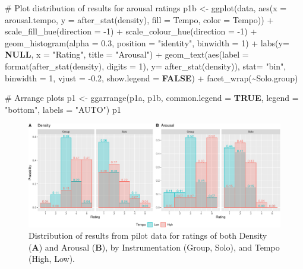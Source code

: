 \documentclass[
  bookmarksnumbered]{article}
\newenvironment{Shaded}{\begin{snugshade}}{\end{snugshade}}
\newcommand{\AttributeTok}[1]{\textcolor[rgb]{0.80,0.80,0.80}{#1}}
\newcommand{\CommentTok}[1]{\textcolor[rgb]{0.50,0.62,0.50}{#1}}
\newcommand{\ConstantTok}[1]{\textcolor[rgb]{0.86,0.64,0.64}{\textbf{#1}}}
\newcommand{\DecValTok}[1]{\textcolor[rgb]{0.86,0.86,0.80}{#1}}
\newcommand{\FloatTok}[1]{\textcolor[rgb]{0.75,0.75,0.82}{#1}}
\newcommand{\FunctionTok}[1]{\textcolor[rgb]{0.94,0.94,0.56}{#1}}
\newcommand{\NormalTok}[1]{\textcolor[rgb]{0.80,0.80,0.80}{#1}}
\newcommand{\OtherTok}[1]{\textcolor[rgb]{0.94,0.94,0.56}{#1}}
\newcommand{\SpecialCharTok}[1]{\textcolor[rgb]{0.86,0.64,0.64}{#1}}
\newcommand{\StringTok}[1]{\textcolor[rgb]{0.80,0.58,0.58}{#1}}
\begin{document}
\begin{Shaded}
\begin{Highlighting}[]
\CommentTok{\# Plot distribution of results for arousal ratings}
\NormalTok{p1b }\OtherTok{\textless{}{-}} \FunctionTok{ggplot}\NormalTok{(data, }\FunctionTok{aes}\NormalTok{(}\AttributeTok{x =}\NormalTok{ arousal.tempo, }\AttributeTok{y =} \FunctionTok{after\_stat}\NormalTok{(density),}
                       \AttributeTok{fill =}\NormalTok{ Tempo, }\AttributeTok{color =}\NormalTok{ Tempo)) }\SpecialCharTok{+}
  \FunctionTok{scale\_fill\_hue}\NormalTok{(}\AttributeTok{direction =} \SpecialCharTok{{-}}\DecValTok{1}\NormalTok{) }\SpecialCharTok{+} \FunctionTok{scale\_colour\_hue}\NormalTok{(}\AttributeTok{direction =} \SpecialCharTok{{-}}\DecValTok{1}\NormalTok{) }\SpecialCharTok{+}
  \FunctionTok{geom\_histogram}\NormalTok{(}\AttributeTok{alpha =} \FloatTok{0.3}\NormalTok{, }\AttributeTok{position =} \StringTok{"identity"}\NormalTok{, }\AttributeTok{binwidth =} \DecValTok{1}\NormalTok{) }\SpecialCharTok{+}
  \FunctionTok{labs}\NormalTok{(}\AttributeTok{y=} \ConstantTok{NULL}\NormalTok{, }\AttributeTok{x =} \StringTok{"Rating"}\NormalTok{, }\AttributeTok{title =} \StringTok{"Arousal"}\NormalTok{) }\SpecialCharTok{+}
  \FunctionTok{geom\_text}\NormalTok{(}\FunctionTok{aes}\NormalTok{(}\AttributeTok{label =} \FunctionTok{format}\NormalTok{(}\FunctionTok{after\_stat}\NormalTok{(density), }\AttributeTok{digits =} \DecValTok{1}\NormalTok{), }\AttributeTok{y=} \FunctionTok{after\_stat}\NormalTok{(density)), }
            \AttributeTok{stat=} \StringTok{"bin"}\NormalTok{, }\AttributeTok{binwidth =} \DecValTok{1}\NormalTok{, }
            \AttributeTok{vjust =} \SpecialCharTok{{-}}\FloatTok{0.2}\NormalTok{,}
            \AttributeTok{show.legend =} \ConstantTok{FALSE}\NormalTok{) }\SpecialCharTok{+}
  \FunctionTok{facet\_wrap}\NormalTok{(}\SpecialCharTok{\textasciitilde{}}\NormalTok{Solo.group)}

\CommentTok{\# Arrange plots}
\NormalTok{p1 }\OtherTok{\textless{}{-}} \FunctionTok{ggarrange}\NormalTok{(p1a, p1b,}
                \AttributeTok{common.legend =} \ConstantTok{TRUE}\NormalTok{,}
                \AttributeTok{legend =} \StringTok{"bottom"}\NormalTok{,}
                \AttributeTok{labels =} \StringTok{"AUTO"}\NormalTok{)}
\NormalTok{p1}
\end{Highlighting}
\end{Shaded}

\begin{figure}
\centering
\includegraphics{Power_analysis_files/figure-latex/unnamed-chunk-7-1.pdf}
\caption{\label{fig:unnamed-chunk-7}Distribution of results from pilot data for ratings of both Density (\textbf{A}) and Arousal (\textbf{B}), by Instrumentation (Group, Solo), and Tempo (High, Low).}
\end{figure}
\end{document}

